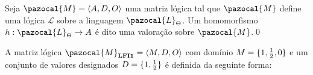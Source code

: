         \begin{definicao}[Valoração]
            Seja $\pazocal{M} = \langle A, D, O \rangle$ uma matriz lógica tal que $\pazocal{M}$ define uma lógica $\mathcal{L}$ sobre a linguagem $\pazocal{L}_{\Theta}$. Um homomorfismo $h : \pazocal{L}_{\Theta} \rightarrow A$ é dito uma valoração sobre $\pazocal{M}$.\qed{}
        \end{definicao}



        \begin{definicao}
            A matriz lógica $\pazocal{M}_{\lfium{}} = \langle M, D, O \rangle$ com domínio $M = \{1, \frac{1}{2}{}, 0\}$ e um conjunto de valores designados $D = \{1, \frac{1}{2}{}\}$ é definida da seguinte forma:


\end{definicao}
